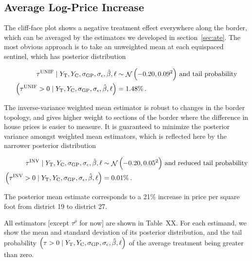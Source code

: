 \documentclass[letter]{article}
\let\Pr\relax
\DeclareMathOperator{\Pr}{\mathbb{P}}
\DeclareMathOperator{\normal}{\mathcal{N}}
\newcommand{\treat}{\mathrm{T}}
\newcommand{\ctrol}{\mathrm{C}}
\newcommand{\sigmaf}{\sigma_{\mathrm{GP}}}
\newcommand{\sigman}{\sigma_{\epsilon}}
\newcommand{\unifavg}{\tau^{\mathrm{UNIF}}}
\newcommand{\invvar}{\tau^{\mathrm{INV}}}
\newcommand{\taurho}{\tau^{\rho}}
\begin{document}
    	\subsection{Average Log-Price Increase}\label{average-log-price-increase}

The cliff-face plot shows a negative treatment effect everywhere along the border, which can be averaged by the estimators we developed in section~\ref{sec:ate}. The most obvious approach is to take an unweighted mean at each equispaced sentinel, which has posterior distribution

\begin{equation}
\begin{split}
    \unifavg \mid Y_\treat{}, Y_\ctrol{}, \sigmaf, \sigman, \hat{\beta}, \ell &\sim \normal\del{-0.20, 0.09^2}\,\text{and tail probability} \\
    \Pr\del{\unifavg > 0 \mid Y_\treat{}, Y_\ctrol{}, \sigmaf, \sigman, \hat{\beta}, \ell} &= 1.48\% \,.
\end{split}
\end{equation}

The inverse-variance weighted mean estimator is robust to changes in the border topology, and gives higher weight to sections of the border where the difference in house prices is easier to measure. It is guaranteed to minimize the posterior variance amongst weighted mean estimators, which is reflected here by the narrower posterior distribution

\begin{equation}
\begin{split}
    \invvar \mid Y_\treat{}, Y_\ctrol{}, \sigmaf, \sigman, \hat{\beta}, \ell &\sim \normal\del{-0.20, 0.05^2}\,\text{and reduced tail probability} \\
    \Pr\del{\invvar > 0 \mid Y_\treat{}, Y_\ctrol{}, \sigmaf, \sigman, \hat{\beta}, \ell} &= 0.01\% \,.
\end{split}
\end{equation}

The posterior mean estimate corresponds to a 21\% increase in price per square foot from district 19 to district 27.

All estimators {[}except \(\taurho\) for now{]} are shown in Table~XX. For each estimand, we show the mean and standard deviation of its posterior distribution, and the tail probability \(\Pr\del{\tau > 0 \mid Y_\treat{}, Y_\ctrol{}, \sigmaf, \sigman, \hat{\beta}, \ell}\) of the average treatment being greater than zero.
    
\end{document}
